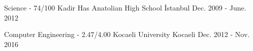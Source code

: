 

\begin{cventries}

  \cventry
    {Science - 74/100} %
    {Kadir Has Anatolian High School} %
    {İstanbul} %
    {Dec. 2009 - June. 2012} %
    {}

  \cventry
    {Computer Engineering - 2.47/4.00} %
    {Kocaeli University} %
    {Kocaeli} %
    {Dec. 2012 - Nov. 2016} %
    {}

\end{cventries}
